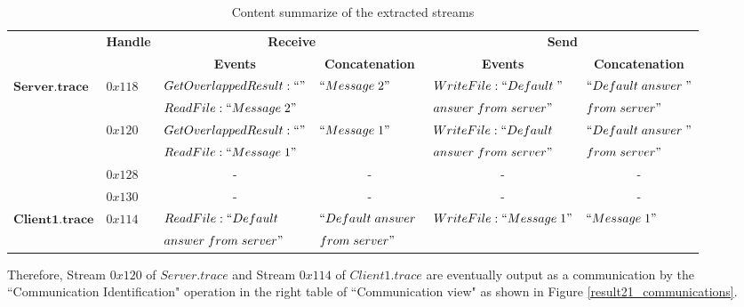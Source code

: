 \begin{table}[H]
  \tiny
  \centering
  \caption{Content summarize of the extracted streams}
  \label{contentresult21}
  \begin{tabular}{|l|l|l|l|l|l|}
\hline            
& \multirow{2}{*}{\textbf{Handle}} & \multicolumn{2}{c|}{\textbf{Receive} }&\multicolumn{2}{c|}{\textbf{Send}} \\
\cline{3-6}
& &\multicolumn{1}{c|}{ \textbf{Events} }&\multicolumn{1}{c|}{\textbf{ Concatenation}}&\multicolumn{1}{c|}{ \textbf{Events} }&\multicolumn{1}{c|}{\textbf{ Concatenation}}\\
\hline 
\multirow{6}{*}{$\boldsymbol{Server.trace}$} &\multirow{2}{*}{$0x118$} & $GetOverlappedResult:``"$ & \multirow{2}{*}{$``Message\; 2"$} & $WriteFile:``Default\; "$ &  $``Default\; answer\; "$\\
\cline{3-3}
& &$ReadFile:``Message\; 2"$ &  & $answer\; from\; server"$&$from\; server"$\\
\cline{2-6}    
      &\multirow{2}{*}{$0x120$} & $GetOverlappedResult:``"$ & \multirow{2}{*}{$``Message\; 1"$} & $WriteFile:``Default\; $ &  $``Default\; answer\; "$\\
\cline{3-3}
& &$ReadFile:``Message\; 1"$ & &$answer\; from\; server"$ &$from\; server"$\\  
\cline{2-6}   
& $0x128$&\multicolumn{1}{c|}{- }&\multicolumn{1}{c|}{- } &\multicolumn{1}{c|}{- } &\multicolumn{1}{c|}{- }\\  
\cline{2-6}   
& $0x130$&\multicolumn{1}{c|}{- } &\multicolumn{1}{c|}{- } &\multicolumn{1}{c|}{- } &\multicolumn{1}{c|}{- }\\      
\hline  
\multirow{2}{*}{$\boldsymbol{Client1.trace}$ }&\multirow{2}{*}{$0x114$ }& $ReadFile: ``Default\; $ & $``Default\; answer\; $ & \multirow{2}{*}{$WriteFile:``Message\; 1"$ } &  \multirow{2}{*}{$``Message\; 1"$}\\
& &$answer\; from\; server"$& $ from\; server"$ & &\\
\hline
  \end{tabular}
\end{table}

Therefore, Stream $0x120$ of $Server.trace$ and Stream $0x114$ of $Client1.trace$ are eventually output as a communication by the ``Communication Identification" operation in the right table of ``Communication view" as shown in Figure \ref{result21_communications}. 

